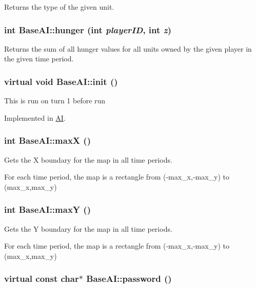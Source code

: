 Returns the type of the given unit. \hypertarget{classBaseAI_e1677c15b8b022dd7335eeb84b57b30f}{
\subsubsection[{hunger}]{\setlength{\rightskip}{0pt plus 5cm}int BaseAI::hunger (int {\em playerID}, \/  int {\em z})}}
\label{classBaseAI_e1677c15b8b022dd7335eeb84b57b30f}


Returns the sum of all hunger values for all units owned by the given player in the given time period. \hypertarget{classBaseAI_90ce8becd6f2e32c2cc32d41145e88df}{
\subsubsection[{init}]{\setlength{\rightskip}{0pt plus 5cm}virtual void BaseAI::init ()}}
\label{classBaseAI_90ce8becd6f2e32c2cc32d41145e88df}


This is run on turn 1 before run 

Implemented in \hyperlink{classAI_8c8e3a635791abaa61585357e6a25f63}{AI}.\hypertarget{classBaseAI_e7574c0a95bc4431f83078c0074b1eec}{
\subsubsection[{maxX}]{\setlength{\rightskip}{0pt plus 5cm}int BaseAI::maxX ()}}
\label{classBaseAI_e7574c0a95bc4431f83078c0074b1eec}


Gets the X boundary for the map in all time periods.

For each time period, the map is a rectangle from (-max\_\-x,-max\_\-y) to (max\_\-x,max\_\-y) \hypertarget{classBaseAI_68f5dfd6450be2649c8c26481ba7c0a5}{
\subsubsection[{maxY}]{\setlength{\rightskip}{0pt plus 5cm}int BaseAI::maxY ()}}
\label{classBaseAI_68f5dfd6450be2649c8c26481ba7c0a5}


Gets the Y boundary for the map in all time periods.

For each time period, the map is a rectangle from (-max\_\-x,-max\_\-y) to (max\_\-x,max\_\-y) \hypertarget{classBaseAI_9251e20447917cda64ad1487b903456f}{
\subsubsection[{password}]{\setlength{\rightskip}{0pt plus 5cm}virtual const char$\ast$ BaseAI::password ()}}
\label{classBaseAI_9251e20447917cda64ad1487b903456f}


